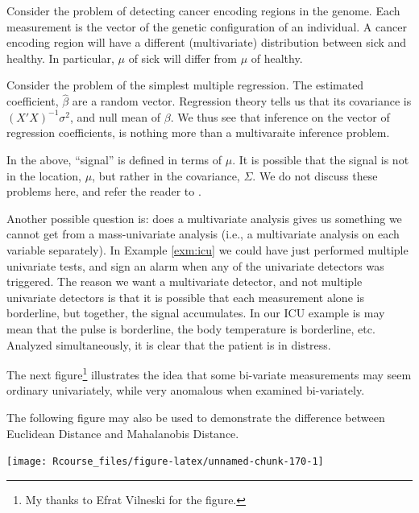 \documentclass[]{book}
\theoremstyle{definition}
\theoremstyle{definition}
\theoremstyle{definition}
\theoremstyle{remark}
\let\BeginKnitrBlock\begin \let\EndKnitrBlock\end
\begin{document}
\BeginKnitrBlock{example}
\protect\hypertarget{exm:genetics}{}{\label{exm:genetics} }Consider the
problem of detecting cancer encoding regions in the genome. Each
measurement is the vector of the genetic configuration of an individual.
A cancer encoding region will have a different (multivariate)
distribution between sick and healthy. In particular, \(\mu\) of sick
will differ from \(\mu\) of healthy.
\EndKnitrBlock{example}

\BeginKnitrBlock{example}
\protect\hypertarget{exm:regression}{}{\label{exm:regression} }Consider the
problem of the simplest multiple regression. The estimated coefficient,
\(\hat \beta\) are a random vector. Regression theory tells us that its
covariance is \((X'X)^{-1}\sigma^2\), and null mean of \(\beta\). We
thus see that inference on the vector of regression coefficients, is
nothing more than a multivaraite inference problem.
\EndKnitrBlock{example}

\BeginKnitrBlock{remark}
{}In the above, ``signal'' is defined in terms
of \(\mu\). It is possible that the signal is not in the location,
\(\mu\), but rather in the covariance, \(\Sigma\). We do not discuss
these problems here, and refer the reader to \citet{nadler2008finite}.
\EndKnitrBlock{remark}

Another possible question is: does a multivariate analysis gives us
something we cannot get from a mass-univariate analysis (i.e., a
multivariate analysis on each variable separately). In Example
\ref{exm:icu} we could have just performed multiple univariate tests,
and sign an alarm when any of the univariate detectors was triggered.
The reason we want a multivariate detector, and not multiple univariate
detectors is that it is possible that each measurement alone is
borderline, but together, the signal accumulates. In our ICU example is
may mean that the pulse is borderline, the body temperature is
borderline, etc. Analyzed simultaneously, it is clear that the patient
is in distress.

The next figure\footnote{My thanks to Efrat Vilneski for the figure.}
illustrates the idea that some bi-variate measurements may seem ordinary
univariately, while very anomalous when examined bi-variately.

\BeginKnitrBlock{remark}
{}The following figure may also be used to
demonstrate the difference between Euclidean Distance and Mahalanobis
Distance.
\EndKnitrBlock{remark}

\texttt{[image: Rcourse\_files/figure-latex/unnamed-chunk-170-1]}
\end{document}
